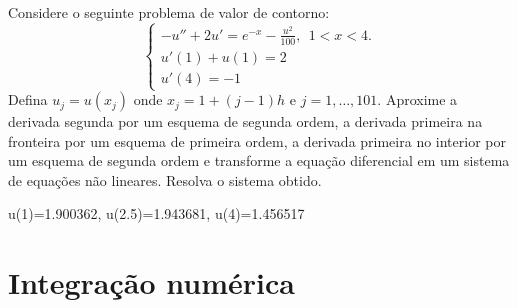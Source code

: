 \begin{Exercise} Considere o seguinte problema de valor de contorno:
$$\left\{\begin{array}{l}-u''+2u'=e^{-x}- \frac{u^2}{100},~~ 1<x<4.\\
u'(1)+u(1)=2\\
u'(4)=-1\end{array}
\right.
$$
Defina $u_j=u(x_j)$ onde $x_j=1+{(j-1)}{h}$ e $j=1,\ldots,101$. Aproxime a derivada segunda por um esquema de segunda ordem, a derivada primeira na fronteira por um esquema de primeira ordem, a derivada primeira no interior por um esquema de segunda ordem e transforme a equação diferencial em um sistema de equações não lineares. Resolva o sistema  obtido.
\end{Exercise}
\begin{Answer}
  \begin{tiny}
u(1)=1.900362, u(2.5)=1.943681, u(4)=1.456517    
  \end{tiny}
\end{Answer}

\section{Integração numérica}

